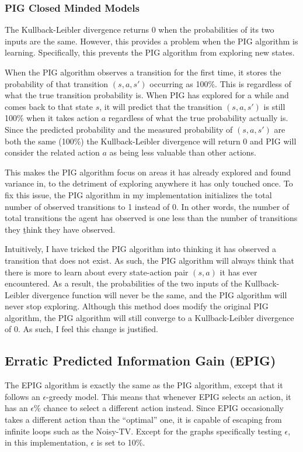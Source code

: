 \documentclass[12pt]{thesis}
\begin{document}
\subsubsection{PIG Closed Minded Models}
The Kullback-Leibler divergence returns 0 when the probabilities of its two inputs are the same. However, this provides a problem when the PIG algorithm is learning. Specifically, this prevents the PIG algorithm from exploring new states.

When the PIG algorithm observes a transition for the first time, it stores the probability of that transition $(s,a,s')$ occurring as 100\%. This is regardless of what the true transition probability is. When PIG has explored for a while and comes back to that state $s$, it will predict that the transition $(s,a,s')$ is still 100\% when it takes action $a$ regardless of what the true probability actually is. Since the predicted probability and the measured probability of $(s,a,s')$ are both the same (100\%) the Kullback-Leibler divergence will return 0 and PIG will consider the related action $a$ as being less valuable than other actions.

This makes the PIG algorithm focus on areas it has already explored and found variance in, to the detriment of exploring anywhere it has only touched once. To fix this issue, the PIG algorithm in my implementation initializes the total number of observed transitions to 1 instead of 0. In other words, the number of total transitions the agent has observed is one less than the number of transitions they \b{think} they have observed.

Intuitively, I have tricked the PIG algorithm into thinking it has observed a transition that does not exist. As such, the PIG algorithm will always think that there is more to learn about every state-action pair $(s,a)$ it has ever encountered. As a result, the probabilities of the two inputs of the Kullback-Leibler divergence function will never be the same, and the PIG algorithm will never stop exploring. Although this method does modify the original PIG algorithm, the PIG algorithm will still converge to a Kullback-Leibler divergence of 0. As such, I feel this change is justified.

\subsection{Erratic Predicted Information Gain (EPIG)}
The EPIG algorithm is exactly the same as the PIG algorithm, except that it follows an $\epsilon$-greedy model. This means that whenever EPIG selects an action, it has an $\epsilon$\% chance to select a different action instead. Since EPIG occasionally takes a different action than the ``optimal'' one, it is capable of escaping from infinite loops such as the Noisy-TV. Except for the graphs specifically testing $\epsilon$, in this implementation, $\epsilon$ is set to 10\%.
\end{document}
